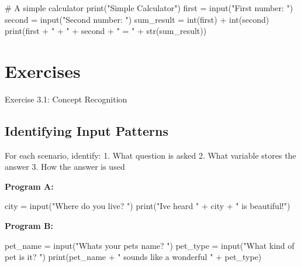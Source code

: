 \documentclass[
  letterpaper,
  DIV=11,
  numbers=noendperiod,
  oneside]{scrreprt}
\newenvironment{Shaded}{}{}
\newcommand{\BuiltInTok}[1]{\textcolor[rgb]{0.84,0.23,0.29}{#1}}
\newcommand{\CommentTok}[1]{\textcolor[rgb]{0.42,0.45,0.49}{#1}}
\newcommand{\NormalTok}[1]{\textcolor[rgb]{0.14,0.16,0.18}{#1}}
\newcommand{\OperatorTok}[1]{\textcolor[rgb]{0.14,0.16,0.18}{#1}}
\newcommand{\StringTok}[1]{\textcolor[rgb]{0.01,0.18,0.38}{#1}}
\begin{document}
\begin{Shaded}
\begin{Highlighting}[]
\CommentTok{\# A simple calculator}
\BuiltInTok{print}\NormalTok{(}\StringTok{"Simple Calculator"}\NormalTok{)}
\NormalTok{first }\OperatorTok{=} \BuiltInTok{input}\NormalTok{(}\StringTok{"First number: "}\NormalTok{)}
\NormalTok{second }\OperatorTok{=} \BuiltInTok{input}\NormalTok{(}\StringTok{"Second number: "}\NormalTok{)}
\NormalTok{sum\_result }\OperatorTok{=} \BuiltInTok{int}\NormalTok{(first) }\OperatorTok{+} \BuiltInTok{int}\NormalTok{(second)}
\BuiltInTok{print}\NormalTok{(first }\OperatorTok{+} \StringTok{" + "} \OperatorTok{+}\NormalTok{ second }\OperatorTok{+} \StringTok{" = "} \OperatorTok{+} \BuiltInTok{str}\NormalTok{(sum\_result))}
\end{Highlighting}
\end{Shaded}

\section{Exercises}\label{exercises-3}

Exercise 3.1: Concept Recognition

\subsection{Identifying Input
Patterns}\label{identifying-input-patterns}

For each scenario, identify: 1. What question is asked 2. What variable
stores the answer 3. How the answer is used

\textbf{Program A:}

\begin{Shaded}
\begin{Highlighting}[]
\NormalTok{city }\OperatorTok{=} \BuiltInTok{input}\NormalTok{(}\StringTok{"Where do you live? "}\NormalTok{)}
\BuiltInTok{print}\NormalTok{(}\StringTok{"I\textquotesingle{}ve heard "} \OperatorTok{+}\NormalTok{ city }\OperatorTok{+} \StringTok{" is beautiful!"}\NormalTok{)}
\end{Highlighting}
\end{Shaded}

\textbf{Program B:}

\begin{Shaded}
\begin{Highlighting}[]
\NormalTok{pet\_name }\OperatorTok{=} \BuiltInTok{input}\NormalTok{(}\StringTok{"What\textquotesingle{}s your pet\textquotesingle{}s name? "}\NormalTok{)}
\NormalTok{pet\_type }\OperatorTok{=} \BuiltInTok{input}\NormalTok{(}\StringTok{"What kind of pet is it? "}\NormalTok{)}
\BuiltInTok{print}\NormalTok{(pet\_name }\OperatorTok{+} \StringTok{" sounds like a wonderful "} \OperatorTok{+}\NormalTok{ pet\_type)}
\end{Highlighting}
\end{Shaded}
\end{document}
